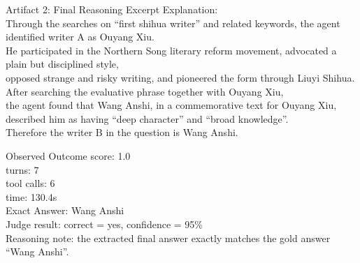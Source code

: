 \begin{CaseTraceBox}{Artifact 2: Final Reasoning Excerpt}
\small\ttfamily
Explanation: \\
Through the searches on ``first shihua writer'' and related keywords, the agent identified writer A as Ouyang Xiu. \\
He participated in the Northern Song literary reform movement, advocated a plain but disciplined style, \\
opposed strange and risky writing, and pioneered the form through Liuyi Shihua. \\
After searching the evaluative phrase together with Ouyang Xiu, \\
the agent found that Wang Anshi, in a commemorative text for Ouyang Xiu, \\
described him as having ``deep character'' and ``broad knowledge''. \\
Therefore the writer B in the question is Wang Anshi.
\end{CaseTraceBox}

\begin{CaseAnswerBox}{Observed Outcome}
\small\ttfamily
score: 1.0 \\
turns: 7 \\
tool calls: 6 \\
time: 130.4s \\
Exact Answer: Wang Anshi \\
Judge result: correct = yes, confidence = 95\% \\
Reasoning note: the extracted final answer exactly matches the gold answer ``Wang Anshi''.
\end{CaseAnswerBox}

\FloatBarrier
